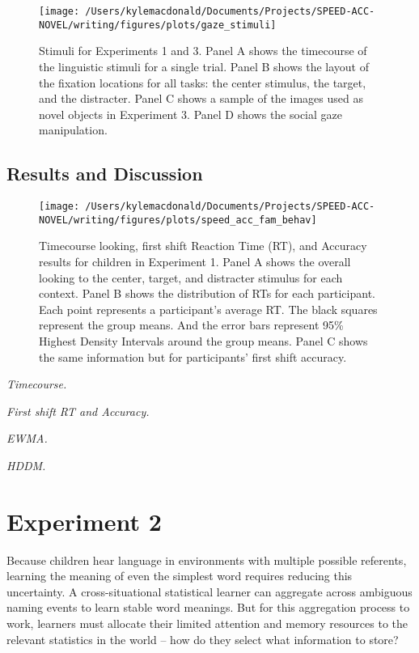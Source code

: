 \documentclass[man,floatsintext]{apa6}
\begin{document}
\begin{figure}[!t]

{\centering \texttt{[image: /Users/kylemacdonald/Documents/Projects/SPEED-ACC-NOVEL/writing/figures/plots/gaze\_stimuli]} 

}

\caption{Stimuli for Experiments 1 and 3. Panel A shows the timecourse of the linguistic stimuli for a single trial. Panel B shows the layout of the fixation locations for all tasks: the center stimulus, the target, and the distracter. Panel C shows a sample of the images used as novel objects in Experiment 3. Panel D shows the social gaze manipulation.}\label{fig:gaze-stimuli}
\end{figure}

\subsection{Results and Discussion}\label{results-and-discussion}

\begin{figure}[!t]

{\centering \texttt{[image: /Users/kylemacdonald/Documents/Projects/SPEED-ACC-NOVEL/writing/figures/plots/speed\_acc\_fam\_behav]} 

}

\caption{Timecourse looking, first shift Reaction Time (RT), and Accuracy results for children in Experiment 1. Panel A shows the overall looking to the center, target, and distracter stimulus for each context. Panel B shows the distribution of RTs for each participant. Each point represents a participant's average RT. The black squares represent the group means. And the error bars represent 95\% Highest Density Intervals around the group means. Panel C shows the same information but for participants' first shift accuracy.}\label{fig:speed-acc-gaze-results}
\end{figure}

\emph{Timecourse.}

\emph{First shift RT and Accuracy.}

\emph{EWMA.}

\emph{HDDM.}

\section{Experiment 2}\label{experiment-2}

Because children hear language in environments with multiple possible
referents, learning the meaning of even the simplest word requires
reducing this uncertainty. A cross-situational statistical learner can
aggregate across ambiguous naming events to learn stable word meanings.
But for this aggregation process to work, learners must allocate their
limited attention and memory resources to the relevant statistics in the
world -- how do they select what information to store?
\end{document}
